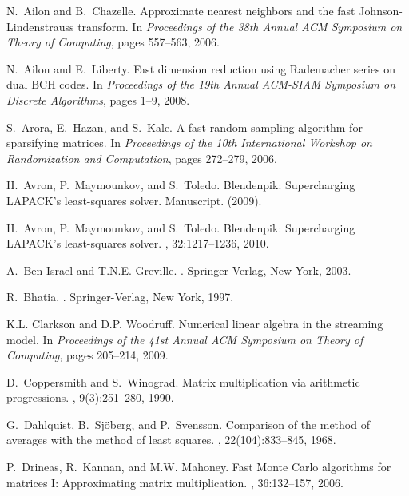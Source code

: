 \documentclass[11pt]{article}
\begin{document}
\begin{thebibliography}{10}

N.~Ailon and B.~Chazelle.
\newblock Approximate nearest neighbors and the fast {J}ohnson-{L}indenstrauss
  transform.
\newblock In {\em Proceedings of the 38th Annual ACM Symposium on Theory of
  Computing}, pages 557--563, 2006.

N.~Ailon and E.~Liberty.
\newblock Fast dimension reduction using {R}ademacher series on dual {BCH}
  codes.
\newblock In {\em Proceedings of the 19th Annual ACM-SIAM Symposium on Discrete
  Algorithms}, pages 1--9, 2008.

S.~Arora, E.~Hazan, and S.~Kale.
\newblock A fast random sampling algorithm for sparsifying matrices.
\newblock In {\em Proceedings of the 10th International Workshop on
  Randomization and Computation}, pages 272--279, 2006.

H.~Avron, P.~Maymounkov, and S.~Toledo.
\newblock Blendenpik: Supercharging {LAPACK}'s least-squares solver.
\newblock Manuscript. (2009).

H.~Avron, P.~Maymounkov, and S.~Toledo.
\newblock Blendenpik: Supercharging {LAPACK}'s least-squares solver.
, 32:1217--1236, 2010.

A.~Ben-Israel and T.N.E. Greville.
.
\newblock Springer-Verlag, New York, 2003.

R.~Bhatia.
.
\newblock Springer-Verlag, New York, 1997.

K.L. Clarkson and D.P. Woodruff.
\newblock Numerical linear algebra in the streaming model.
\newblock In {\em Proceedings of the 41st Annual ACM Symposium on Theory of
  Computing}, pages 205--214, 2009.

D.~Coppersmith and S.~Winograd.
\newblock Matrix multiplication via arithmetic progressions.
, 9(3):251--280, 1990.

G.~Dahlquist, B.~Sj\"{o}berg, and P.~Svensson.
\newblock Comparison of the method of averages with the method of least
  squares.
, 22(104):833--845, 1968.

P.~Drineas, R.~Kannan, and M.W. Mahoney.
\newblock Fast {Monte Carlo} algorithms for matrices {I}: Approximating matrix
  multiplication.
, 36:132--157, 2006.


\end{thebibliography}
\end{document}
